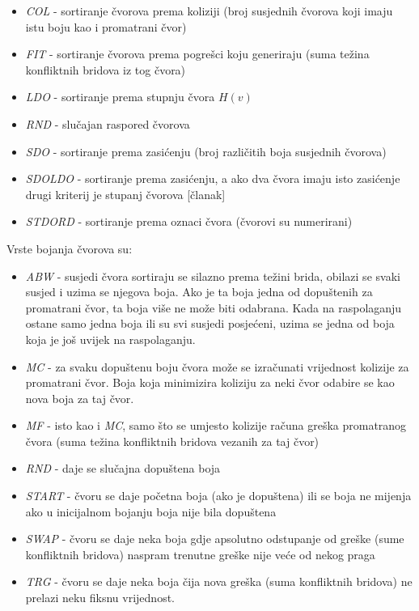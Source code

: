 \documentclass[times, utf8, diplomski, numeric]{fer}
\begin{document}
\begin{itemize}
	\item \emph{COL} - sortiranje čvorova prema koliziji (broj susjednih čvorova koji imaju istu boju kao i promatrani čvor)
	\item \emph{FIT} - sortiranje čvorova prema pogrešci koju generiraju (suma težina konfliktnih bridova iz tog čvora)
	\item \emph{LDO} - sortiranje prema stupnju čvora $H(v)$
	\item \emph{RND} - slučajan raspored čvorova
	\item \emph{SDO} - sortiranje prema zasićenju (broj različitih boja susjednih čvorova)
	\item \emph{SDOLDO} - sortiranje prema zasićenju, a ako dva čvora imaju isto zasićenje drugi kriterij je stupanj čvorova [članak]
	\item \emph{STDORD} - sortiranje prema oznaci čvora (čvorovi su numerirani)
\end{itemize}

Vrste bojanja čvorova su:

\begin{itemize}
	\item \emph{ABW} - susjedi čvora sortiraju se silazno prema težini brida, obilazi se svaki susjed i uzima se njegova boja. Ako je ta boja jedna od dopuštenih za promatrani čvor, ta boja više ne može biti odabrana. Kada na raspolaganju ostane samo jedna boja ili su svi susjedi posjećeni, uzima se jedna od boja koja je još uvijek na raspolaganju. 
	\item \emph{MC} - za svaku dopuštenu boju čvora može se izračunati vrijednost kolizije za promatrani čvor. Boja koja minimizira koliziju za neki čvor odabire se kao nova boja za taj čvor.
	\item \emph{MF} - isto kao i \emph{MC}, samo što se umjesto kolizije računa greška promatranog čvora (suma težina konfliktnih bridova vezanih za taj čvor)
	\item \emph{RND} - daje se slučajna dopuštena boja
	\item \emph{START} - čvoru se daje početna boja (ako je dopuštena) ili se boja ne mijenja ako u inicijalnom bojanju boja nije bila dopuštena
	\item \emph{SWAP} - čvoru se daje neka boja gdje apsolutno odstupanje od greške (sume konfliktnih bridova) naspram trenutne greške nije veće od nekog praga
	\item \emph{TRG} - čvoru se daje neka boja čija nova greška (suma konfliktnih bridova) ne prelazi neku fiksnu vrijednost. 
\end{itemize}
\end{document}
